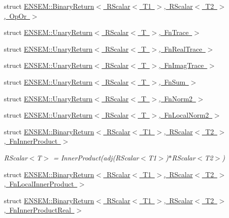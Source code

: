 \begin{DoxyCompactItemize}
\item 
struct \mbox{\hyperlink{structENSEM_1_1BinaryReturn_3_01RScalar_3_01T1_01_4_00_01RScalar_3_01T2_01_4_00_01OpOr_01_4}{E\+N\+S\+E\+M\+::\+Binary\+Return$<$ R\+Scalar$<$ T1 $>$, R\+Scalar$<$ T2 $>$, Op\+Or $>$}}
\item 
struct \mbox{\hyperlink{structENSEM_1_1UnaryReturn_3_01RScalar_3_01T_01_4_00_01FnTrace_01_4}{E\+N\+S\+E\+M\+::\+Unary\+Return$<$ R\+Scalar$<$ T $>$, Fn\+Trace $>$}}
\item 
struct \mbox{\hyperlink{structENSEM_1_1UnaryReturn_3_01RScalar_3_01T_01_4_00_01FnRealTrace_01_4}{E\+N\+S\+E\+M\+::\+Unary\+Return$<$ R\+Scalar$<$ T $>$, Fn\+Real\+Trace $>$}}
\item 
struct \mbox{\hyperlink{structENSEM_1_1UnaryReturn_3_01RScalar_3_01T_01_4_00_01FnImagTrace_01_4}{E\+N\+S\+E\+M\+::\+Unary\+Return$<$ R\+Scalar$<$ T $>$, Fn\+Imag\+Trace $>$}}
\item 
struct \mbox{\hyperlink{structENSEM_1_1UnaryReturn_3_01RScalar_3_01T_01_4_00_01FnSum_01_4}{E\+N\+S\+E\+M\+::\+Unary\+Return$<$ R\+Scalar$<$ T $>$, Fn\+Sum $>$}}
\item 
struct \mbox{\hyperlink{structENSEM_1_1UnaryReturn_3_01RScalar_3_01T_01_4_00_01FnNorm2_01_4}{E\+N\+S\+E\+M\+::\+Unary\+Return$<$ R\+Scalar$<$ T $>$, Fn\+Norm2 $>$}}
\item 
struct \mbox{\hyperlink{structENSEM_1_1UnaryReturn_3_01RScalar_3_01T_01_4_00_01FnLocalNorm2_01_4}{E\+N\+S\+E\+M\+::\+Unary\+Return$<$ R\+Scalar$<$ T $>$, Fn\+Local\+Norm2 $>$}}
\item 
struct \mbox{\hyperlink{structENSEM_1_1BinaryReturn_3_01RScalar_3_01T1_01_4_00_01RScalar_3_01T2_01_4_00_01FnInnerProduct_01_4}{E\+N\+S\+E\+M\+::\+Binary\+Return$<$ R\+Scalar$<$ T1 $>$, R\+Scalar$<$ T2 $>$, Fn\+Inner\+Product $>$}}
\begin{DoxyCompactList}\small\item\em R\+Scalar$<$\+T$>$ = Inner\+Product(adj(\+R\+Scalar$<$\+T1$>$)$\ast$\+R\+Scalar$<$\+T2$>$) \end{DoxyCompactList}\item 
struct \mbox{\hyperlink{structENSEM_1_1BinaryReturn_3_01RScalar_3_01T1_01_4_00_01RScalar_3_01T2_01_4_00_01FnLocalInnerProduct_01_4}{E\+N\+S\+E\+M\+::\+Binary\+Return$<$ R\+Scalar$<$ T1 $>$, R\+Scalar$<$ T2 $>$, Fn\+Local\+Inner\+Product $>$}}
\item 
struct \mbox{\hyperlink{structENSEM_1_1BinaryReturn_3_01RScalar_3_01T1_01_4_00_01RScalar_3_01T2_01_4_00_01FnInnerProductReal_01_4}{E\+N\+S\+E\+M\+::\+Binary\+Return$<$ R\+Scalar$<$ T1 $>$, R\+Scalar$<$ T2 $>$, Fn\+Inner\+Product\+Real $>$}}

\end{DoxyCompactItemize}

